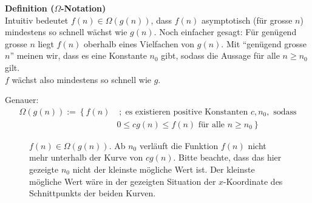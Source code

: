 \begin{frame}
\textbf{Definition ($\Omega$-Notation)}\\
Intuitiv bedeutet $f(n)\in\Omega(g(n))$, dass $f(n)$ asymptotisch (für grosse $n$) mindestens so schnell wächst wie $g(n)$. Noch einfacher gesagt: Für genügend grosse $n$ liegt $f(n)$ oberhalb eines Vielfachen von $g(n)$. Mit \enquote{genügend grosse $n$} meinen wir, dass es eine Konstante $n_0$ gibt, sodass die Aussage für alle $n\geq n_0$ gilt.\\

\vspace{\baselineskip}
$f$ wächst also mindestens so schnell wie $g$.

\vspace{\baselineskip}
Genauer:
\begin{align}\label{eq:Omega}
    \Omega(g(n)) := \left\{ f(n) \right. &  \; ; \; \text{es existieren positive Konstanten } c, n_0, \text{ sodass} \nonumber \\
    & \left. 0 \leq c g(n) \leq f(n) \text{ für alle } n \geq n_0 \right\}
\end{align}
\end{frame}

\begin{frame}
\begin{figure}
    \centering
{}
\caption{$f(n)\in \Omega(g(n))$. Ab $n_0$ verläuft die Funktion $f(n)$ nicht mehr unterhalb der Kurve von $cg(n)$. Bitte beachte, dass das hier gezeigte $n_0$ nicht der kleinste mögliche Wert ist. Der kleinste mögliche Wert wäre in der gezeigten Situation der $x$-Koordinate des Schnittpunkts der beiden Kurven.}
\label{fig:Omega}
\end{figure}
\end{frame}

